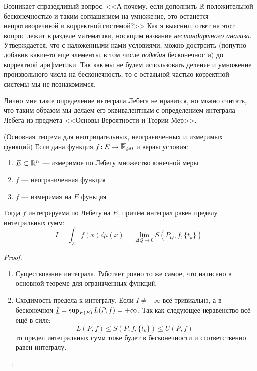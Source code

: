 \begin{anote}
	Возникает справедливый вопрос: <<А почему, если дополнить $\mathbb{R}$ положительной бесконечностью и таким соглашением на умножение, это останется непротиворечивой и корректной системой?>> Как я выяснил, ответ на этот вопрос лежит в разделе математики, носящим название \textit{нестандартного анализа}. Утверждается, что с наложенными нами условиями, можно достроить (попутно добавив какие-то ещё элементы, в том числе \textit{подобия} бесконечности) до корректной арифметики. Так как мы не будем использовать деление и умножение произвольного числа на бесконечность, то с остальной частью корректной системы мы не познакомимся.
	
	Лично мне такое определение интеграла Лебега не нравится, но можно считать, что таким образом мы делаем его эквивалентным с определением интеграла Лебега из предмета <<Основы Вероятности и Теории Мер>>.
\end{anote}

\begin{theorem} (Основная теорема для неотрицательных, неограниченных и измеримых функций)
	Если дана функция $f \colon E \to \overline{\mathbb{R}}_{\geqslant 0}$ и верны условия:
	\begin{enumerate}
		\item $E \subset \mathbb{R}^n$ --- измеримое по Лебегу множество конечной меры
		
		\item $f$ --- неограниченная функция
		
		\item $f$ --- измеримая на $E$ функция
	\end{enumerate}
	Тогда $f$ интегрируема по Лебегу на $E$, причём интеграл равен пределу интегральных сумм:
	\[
		I = \int_E f(x)d\mu(x) = \lim_{\Delta Q \to 0} S(P_Q, f, \{t_k\})
	\]
\end{theorem}

\begin{proof}~
	\begin{enumerate}
		\item Существование интеграла. Работает ровно то же самое, что написано в основной теореме для ограниченных функций.
		
		\item Сходимость предела к интегралу. Если $I \neq +\infty$ всё тривиально, а в бесконечном $\underline{I} = \sup_{P(E)} L(P, f) = +\infty$. Так как следующее неравенство всё ещё в силе:
		\[
			L(P, f) \le S(P, f, \{t_k\}) \le U(P, f)
		\]
		то предел интегральных сумм тоже будет в бесконечности и соответственно равен интегралу.
	\end{enumerate}
\end{proof}

